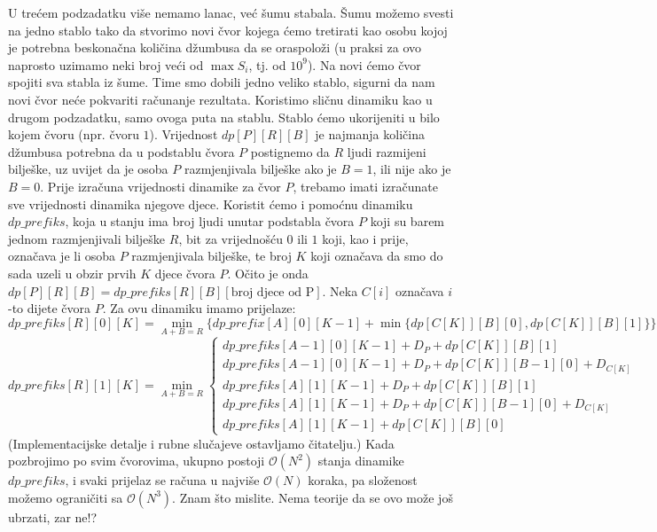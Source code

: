 \documentclass[a4paper]{article}
\begin{document}
U trećem podzadatku više nemamo lanac, već šumu stabala. Šumu možemo svesti na jedno stablo
tako da stvorimo novi čvor kojega ćemo tretirati kao osobu kojoj je potrebna beskonačna količina
džumbusa da se oraspoloži (u praksi za ovo naprosto uzimamo neki broj veći od $\max S_i$, tj. od
$10^9$). Na novi ćemo čvor spojiti sva stabla iz šume. Time smo dobili jedno veliko stablo,
sigurni da nam novi čvor neće pokvariti računanje rezultata.
Koristimo sličnu dinamiku kao u drugom podzadatku, samo ovoga puta na stablu. Stablo ćemo
ukorijeniti u bilo kojem čvoru (npr. čvoru $1$). Vrijednost $dp[P][R][B]$ je najmanja količina
džumbusa potrebna da u podstablu čvora $P$ postignemo da $R$ ljudi razmijeni bilješke,
uz uvijet da je osoba $P$ razmjenjivala bilješke ako je $B = 1$, ili nije ako je $B = 0$.
Prije izračuna vrijednosti dinamike za čvor $P$, trebamo imati izračunate sve vrijednosti
dinamika njegove djece. Koristit ćemo i pomoćnu dinamiku $dp\_prefiks$, koja u stanju ima broj
ljudi unutar podstabla čvora $P$ koji su barem jednom razmjenjivali bilješke $R$,
bit za vrijednošću $0$ ili $1$ koji, kao i prije, označava je li osoba $P$ razmjenjivala
bilješke, te broj $K$ koji označava da smo do sada uzeli u obzir prvih $K$ djece čvora $P$.
Očito je onda $dp[P][R][B] = dp\_prefiks[R][B][\text{broj djece od P}]$. Neka $C[i]$ označava
$i$-to dijete čvora $P$. Za ovu dinamiku imamo prijelaze:
$$
dp\_prefiks[R][0][K] =
\min_{A + B = R} \{ dp\_prefix[A][0][K-1] + \min \{ dp[C[K]][B][0], dp[C[K]][B][1] \} \}
$$
$$
dp\_prefiks[R][1][K] = \min_{A + B = R}
\begin{cases}
    dp\_prefiks[A-1][0][K-1] + D_P + dp[C[K]][B][1] \\
    dp\_prefiks[A-1][0][K-1] + D_P + dp[C[K]][B-1][0] + D_{C[K]} \\
    dp\_prefiks[A][1][K-1] + D_P + dp[C[K]][B][1] \\
    dp\_prefiks[A][1][K-1] + D_P + dp[C[K]][B-1][0] + D_{C[K]} \\
    dp\_prefiks[A][1][K-1] + dp[C[K]][B][0]
\end{cases}
$$
(Implementacijske detalje i rubne slučajeve ostavljamo čitatelju.)
Kada pozbrojimo po svim čvorovima, ukupno postoji $\mathcal{O}(N^2)$ stanja dinamike
$dp\_prefiks$, i svaki prijelaz se računa u najviše $\mathcal{O}(N)$ koraka, pa složenost možemo
ograničiti sa $\mathcal{O}(N^3)$.
Znam što mislite. Nema teorije da se ovo može još ubrzati, zar ne!? 
\end{document}
